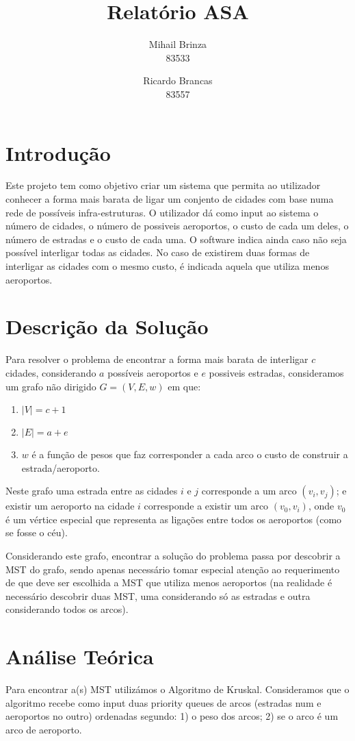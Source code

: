 \documentclass[a4paper]{article}
\title{\LARGE \textbf{Relatório ASA}}
\author{Mihail Brinza \\ \scriptsize 83533 \normalsize \and Ricardo Brancas \\ \scriptsize 83557 \normalsize}
\begin{document}
	\maketitle
	\section{Introdução}
	Este projeto tem como objetivo criar um sistema que permita ao utilizador conhecer
	a forma mais barata de ligar um conjento de cidades com base numa rede de possíveis
	infra-estruturas.
	O utilizador dá como input ao sistema o número de cidades, o número de possiveis aeroportos,
	o custo de cada um deles, o número de estradas e o custo de cada uma.
	O software indica ainda caso não seja possível interligar todas as cidades.
	No caso de existirem duas formas de interligar as cidades com o mesmo custo,
	é indicada aquela que utiliza menos aeroportos.

	\section{Descrição da Solução}
	Para resolver o problema de encontrar a forma mais barata de interligar $c$
	cidades, considerando $a$ possíveis aeroportos e $e$ possiveis estradas,
	consideramos um grafo não dirigido $G = (V, E, w)$ em que:
	\begin{enumerate}
		\item $|V| = c + 1$
		\item $|E| = a + e$
		\item $w$ é a função de pesos que faz corresponder a cada arco o custo
		 de construir a estrada/aeroporto.
	\end{enumerate}
	Neste grafo uma estrada entre as cidades $i$ e $j$ corresponde a um arco
	$(v_i, v_j)$; e existir um aeroporto na cidade $i$ corresponde a existir
	um arco $(v_0, v_i)$, onde $v_0$ é um vértice especial que representa as
	ligações entre todos os aeroportos (como se fosse o céu).

	Considerando este grafo, encontrar a solução do problema passa por descobrir
	a MST do grafo, sendo apenas necessário tomar especial atenção ao requerimento
	de que deve ser escolhida a MST que utiliza menos aeroportos (na realidade é
	necessário descobrir duas MST, uma considerando só as estradas e outra considerando
	todos os arcos).

	\section{Análise Teórica}
	Para encontrar a(s) MST utilizámos o Algoritmo de Kruskal. Consideramos que
	o algoritmo recebe como input duas priority queues de arcos (estradas num e aeroportos
	no outro) ordenadas segundo: 1) o peso dos arcos; 2) se o arco é um arco de aeroporto.
\end{document}
